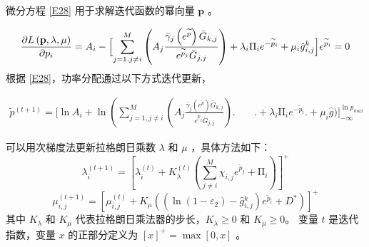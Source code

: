 微分方程 \eqref{E28} 用于求解迭代函数的幂向量 $\mathbf{p}$ 。

\begin{align}\label{E28}
\frac{\partial L\left(\mathbf{p},\lambda,\mu\right)}{\partial p_i}=A_i-\Bigl[\sum_{j=1,j\neq i}^{M}\left(A_j\frac{{\bar{\gamma}}_j\left(e^{\widetilde{p}}\right){\bar{G}}_{k,j}}{e^{{\widetilde{p}}_j}{\bar{G}}_{j,j}}\right)
+\lambda_i\mathrm{\Pi}_ie^{-{\widetilde{p}}_i}+\mu_i{\hat{g}}\phantom{}_{i,j}^k\Bigl]e^{{\widetilde{p}}_i}=0
\end{align}
根据 \eqref{E28}，功率分配通过以下方式迭代更新，

\begin{align}\label{E29}
{\widetilde{p}}\phantom{}^{\left(t+1\right)}=\Big[\ln{A_i}+\ln\left(\sum_{j=1,j\neq i}^{M}\left(A_j\frac{{\bar{\gamma}}_j\left(e^{\widetilde{p}}\right){\bar{G}}_{k,j}}{e^{{\widetilde{p}}_j}{\bar{G}}_{j,j}}\right)\Big.\right.\phantom{=\;\;}\Big.\!\!\!\!\!\!\!\!\!\!\!+\lambda_i\mathrm{\Pi}_ie^{-{\widetilde{p}}_i}\Big.+\mu_i\hat{g}\Big)
\Big]_{-\infty}^{\ln{p_{max}}}
\end{align}

可以用次梯度法更新拉格朗日乘数 $\lambda$ 和 $\mu$ ，具体方法如下：
\begin{equation}\label{E30}
\lambda_i^{\left(t+1\right)}=\left[\lambda_i^{\left(t\right)}+K_\lambda^{\left(t\right)}\left(\sum_{j\neq i}^{M}{\chi_{i,j}e^{{\widetilde{p}}_j}}+\mathrm{\Pi}_i\right)\right]^+
\end{equation}
\begin{equation}\label{E31}
\mu_{i,j}^{\left(t+1\right)}=\!\left[\mu_{i,j}^{\left(t\right)}+\!K_\mu\!\left(\left(\ln\left(1-\varepsilon_2\right)-{\hat{g}}\phantom{}_{i,j}^k\right)e^{{\widetilde{p}}_i}+D^\ast\right)\right]^+
\end{equation}
其中 $K_\lambda$ 和 $K_\mu$ 代表拉格朗日乘法器的步长，$K_\lambda\geq0$ 和 $K_\mu\geq0$。 变量 $t$ 是迭代指数，变量 $x$ 的正部分定义为 $\left[x\right]^+=\max{\left[0,x\right]} $ 。

